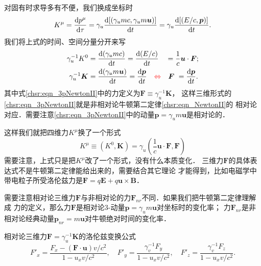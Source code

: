 对固有时求导多有不便，我们换成坐标时
\begin{equation}
	K^\mu =   \frac{{\rm d}{p^\mu}}{{\rm d}\tau}
	= \gamma_{u} \dfrac{{\rm d}[  (\gamma_u m c,\gamma_u m\boldsymbol{u})]}{{\rm d} t}
	= \gamma_{u} \dfrac{{\rm d}[  (E/c,\boldsymbol{p})]}{{\rm d} t} .
\end{equation}
我们将上式的时间、空间分量分开来写
\begin{align}
	\gamma_{u}^{-1} K^0 &= \dfrac{{\rm d}  (\gamma_u m c)}{{\rm d} t}
	= \dfrac{{\rm d}  (E/c)}{{\rm d} t} \quad =\frac{1}{c}\boldsymbol{u}\cdot\boldsymbol{F}; \label{chsr:eqn_p0Fu}  \\
	\gamma_{u}^{-1} \boldsymbol{K} &= \dfrac{{\rm d}  (\gamma_u m \boldsymbol{u})}{{\rm d} t}
	=\dfrac{{\rm d} \boldsymbol{p}}{{\rm d} t}
	\quad {\color{red} \Leftrightarrow} \quad
	\boldsymbol{F} \ = \dfrac{{\rm d} \boldsymbol{p} }{{\rm d} t}. \label{chsr:eqn_3pNewtonII}
\end{align}
其中式\eqref{chsr:eqn_3pNewtonII}中的力定义为$\boldsymbol{F} \equiv \gamma_{u}^{-1} \boldsymbol{K}$，
这样三维形式的\eqref{chsr:eqn_3pNewtonII}就是非相对论牛顿第二定律\eqref{chsr:eqn_NewtonII}的
相对论对应．需要注意\eqref{chsr:eqn_3pNewtonII}中的动量$\boldsymbol{p}=\gamma_u m \boldsymbol{u}$是相对论的．

这样我们就把四维力$K^\mu$换了一个形式
\begin{equation}\label{chsr:eqn_4dforce-3d}
	K^\mu \equiv (K^0,\boldsymbol{K}) = \gamma_{u} \left(\frac{1}{c}\boldsymbol{u}\cdot\boldsymbol{F}, \boldsymbol{F} \right)
\end{equation}
需要注意，上式只是把$K^\mu$改了一个形式，没有什么本质变化．
三维力$\boldsymbol{F}$的具体表达式不是牛顿第二定律能给出来的，需要结合其它理论
才能得到，比如电磁学中带电粒子所受洛伦兹力是$\boldsymbol{F}=q \boldsymbol{E}+q \boldsymbol{u}\times\boldsymbol{B}$．

需要注意相对论三维力$\boldsymbol{F}$与非相对论的力$\boldsymbol{F}_{nr}$不同．如果我们把牛顿第二定律理解成
力的定义，那么力$\boldsymbol{F}$是相对论3-动量$\boldsymbol{p}=\gamma_{u} m \boldsymbol{u}$对坐标时的变化率；
力$\boldsymbol{F}_{nr}$是非相对论经典动量$\boldsymbol{p}_{nr}= m \boldsymbol{u}$对牛顿绝对时间的变化率．


相对论三维力$\boldsymbol{F}=\gamma_{u}^{-1} \boldsymbol{K}$的洛伦兹变换公式
\begin{equation}
	F'_x = \dfrac{F_x - (\boldsymbol{F}\cdot \boldsymbol{u})v/c^2}{1-u_x v/c^2}, \quad
	F'_y = \dfrac{\gamma_v^{-1}F_y}{1-u_x v/c^2}, \quad
	F'_z = \dfrac{\gamma_v^{-1}F_z}{1-u_x v/c^2}.
\end{equation}




